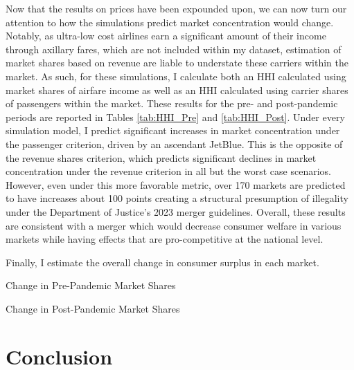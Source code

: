 \documentclass{article}
\begin{document}
    Now that the results on prices have been expounded upon, we can now turn our attention to how the simulations predict market concentration would change. Notably, as ultra-low cost airlines earn a significant amount of their income through axillary fares, which are not included within my dataset, estimation of market shares based on revenue are liable to understate these carriers within the market. As such, for these simulations, I calculate both an HHI calculated using market shares of airfare income as well as an HHI calculated using carrier shares of passengers within the market. These results for the pre- and post-pandemic periods are reported in Tables \ref{tab:HHI_Pre} and \ref{tab:HHI_Post}. Under every simulation model, I predict significant increases in market concentration under the passenger criterion, driven by an ascendant JetBlue. This is the opposite of the revenue shares criterion, which predicts significant declines in market concentration under the revenue criterion in all but the worst case scenarios. However, even under this more favorable metric, over 170 markets are predicted to have increases about 100 points creating a structural presumption of illegality under the Department of Justice's 2023 merger guidelines. Overall, these results are consistent with a merger which would decrease consumer welfare in various markets while having effects that are pro-competitive at the national level.  

    Finally, I estimate the overall change in consumer surplus in each market. 

    \begin{table}
        \caption{Change in Pre-Pandemic Market Shares}
        \label{tab:HHI_Pre}
    \vspace{-15mm}
        \begin{center}

        \end{center}
    \end{table}
    
      \begin{table}
        \caption{Change in Post-Pandemic Market Shares}
        \label{tab:HHI_Post}
        \vspace{-15mm}
        \begin{center}
        
        \end{center}
    \end{table}
    
	\section{Conclusion}
	\label{sec:Conclusion}
	
\end{document}
